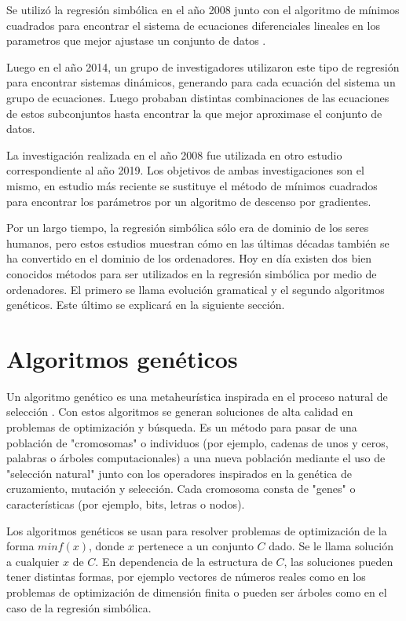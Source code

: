 Se utilizó la regresión simbólica en el año 2008 junto con el algoritmo de mínimos cuadrados para encontrar el sistema de ecuaciones diferenciales lineales en los parametros que mejor ajustase un conjunto de datos \cite{iba2008inference}.

Luego en el año 2014, un grupo de investigadores utilizaron este tipo de regresión para encontrar sistemas dinámicos, generando para cada ecuación del sistema un grupo de ecuaciones. Luego probaban distintas combinaciones de las ecuaciones de estos subconjuntos hasta encontrar la que mejor aproximase el conjunto de datos. \cite{gaucel2014learning}

La investigación realizada en el año 2008 fue utilizada en otro estudio correspondiente al año 2019. Los objetivos de ambas investigaciones son el mismo, en estudio más reciente se sustituye el método de mínimos cuadrados para encontrar los parámetros por un algoritmo de descenso por gradientes. \cite{kronberger2019identification}

Por un largo tiempo, la regresión simbólica sólo era de dominio de los seres humanos, pero estos estudios muestran cómo en las últimas décadas también se ha convertido en el dominio de los ordenadores. Hoy en día existen dos bien conocidos métodos para ser utilizados en la regresión simbólica por medio de ordenadores. El primero se llama evolución gramatical y el segundo algoritmos genéticos. \cite{zelinka2005analytic} Este último se explicará en la siguiente sección.

\section{Algoritmos genéticos}

Un algoritmo genético es una metaheurística inspirada en el proceso natural de selección \cite{mitchell1998introduction}. Con estos algoritmos se generan soluciones de alta calidad en problemas de optimización y búsqueda. Es un método para pasar de una población de "cromosomas" o individuos (por ejemplo, cadenas de unos y ceros, palabras o árboles computacionales) a una nueva población mediante el uso de "selección natural" junto con los operadores inspirados en la genética de cruzamiento, mutación y selección. Cada cromosoma consta de "genes" o características (por ejemplo, bits, letras o nodos).

Los algoritmos genéticos se usan para resolver problemas de optimización de la forma $min f(x)$, donde $x$ pertenece a un conjunto $C$ dado. Se le llama solución a cualquier $x$ de $C$. En dependencia de la estructura de $C$, las soluciones pueden tener distintas formas, por ejemplo vectores de números reales como en los problemas de optimización de dimensión finita o pueden ser árboles como en el caso de la regresión simbólica.

